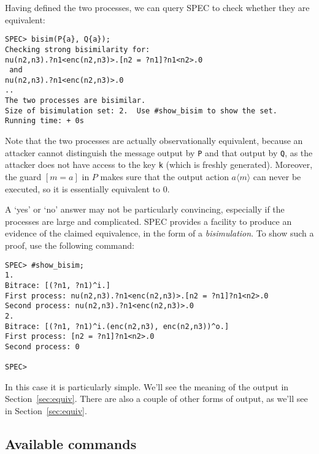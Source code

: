 \documentclass{article}
\begin{document}
Having defined the two processes, we can query SPEC to check whether they are
equivalent:

\begin{verbatim}
SPEC> bisim(P{a}, Q{a});
Checking strong bisimilarity for: 
nu(n2,n3).?n1<enc(n2,n3)>.[n2 = ?n1]?n1<n2>.0
 and 
nu(n2,n3).?n1<enc(n2,n3)>.0
..
The two processes are bisimilar.
Size of bisimulation set: 2.  Use #show_bisim to show the set.
Running time: + 0s
\end{verbatim}

Note that the two processes are actually observationally equivalent, because
an attacker cannot distinguish the message output by \texttt{P} and
that output by \texttt{Q}, as the attacker does not have access to the
key \texttt{k} (which is freshly generated). Moreover, the guard $[m = a]$ in
$P$ makes sure that the output action $a\langle m \rangle$ can never
be executed, so it is essentially equivalent to $0$.

A `yes' or `no' answer may not be particularly convincing, especially if the processes are
large and complicated. SPEC provides a facility to produce an evidence of the
claimed equivalence, in the form of a {\em bisimulation}. To show such a 
proof, use the following command:

\begin{verbatim}
SPEC> #show_bisim;     
1. 
Bitrace: [(?n1, ?n1)^i.]
First process: nu(n2,n3).?n1<enc(n2,n3)>.[n2 = ?n1]?n1<n2>.0
Second process: nu(n2,n3).?n1<enc(n2,n3)>.0
2. 
Bitrace: [(?n1, ?n1)^i.(enc(n2,n3), enc(n2,n3))^o.]
First process: [n2 = ?n1]?n1<n2>.0
Second process: 0

SPEC>
\end{verbatim}

In this case it is particularly simple. 
We'll see the meaning of the output in Section~\ref{sec:equiv}. 
There are also a couple of other forms of output, as we'll see in Section~\ref{sec:equiv}. 

\subsection{Available commands}
\end{document}

